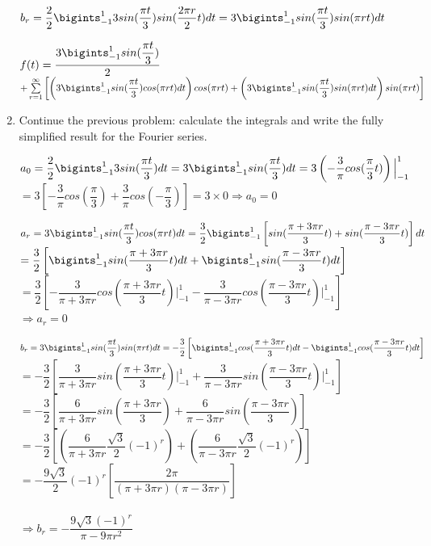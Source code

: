 \documentclass[fleqn]{article}
\begin{document}
\begin{enumerate}
    \textcolor{hwColor}{
      $b_r=\dfrac{2}{2}\bigints_{-1}^{1}3sin(\dfrac{\pi t}{3}) sin(\dfrac{2\pi r}{2}t)dt=3\bigints_{-1}^{1}sin(\dfrac{\pi t}{3}) sin(\pi rt)dt$ \\ 
    }

    \textcolor{hwColor}{
      $f(t)=\dfrac{3 \bigints_{-1}^{1}sin(\dfrac{\pi t}{3})}{2}$ \\
      $+\sum\limits_{r=1}^{\infty}\left[\left(3\bigints_{-1}^{1}sin(\dfrac{\pi t}{3}) cos(\pi rt)dt\right) cos(\pi rt)+\left(3\bigints_{-1}^{1}sin(\dfrac{\pi t}{3}) sin(\pi rt)dt\right) sin(\pi rt)\right]$
    }
    

  \item Continue the previous problem:  calculate the integrals and write the fully simplified result for the Fourier series.

    \textcolor{hwColor}{
      $a_0=\dfrac{2}{2}\bigints_{-1}^{1}3sin(\dfrac{\pi t}{3})dt=3 \bigints_{-1}^{1}sin(\dfrac{\pi t}{3})dt=3\left(-\dfrac{3}{\pi}cos(\dfrac{\pi}{3}t)\right)\Big|_{-1}^{1}$ \\
      $=3\left[-\dfrac{3}{\pi}cos(\dfrac{\pi}{3})+\dfrac{3}{\pi}cos(-\dfrac{\pi}{3})\right]=3 \times 0 \Longrightarrow a_0=0$
    }

    \bigbreak

    \textcolor{hwColor}{
      $a_r=3\bigints_{-1}^{1}sin(\dfrac{\pi t}{3}) cos(\pi rt)dt=\dfrac{3}{2}\bigints_{-1}^{1}\left[sin(\dfrac{\pi +3\pi r}{3}t)+sin(\dfrac{\pi - 3\pi r}{3}t)\right]dt$ \\
      $=\dfrac{3}{2}\left[\bigints_{-1}^{1}sin(\dfrac{\pi +3\pi r}{3}t) dt+\bigints_{-1}^{1}sin(\dfrac{\pi - 3\pi r}{3}t) dt\right]$ \\
      $=\dfrac{3}{2} \left[-\dfrac{3}{\pi + 3\pi r}cos(\dfrac{\pi + 3\pi r}{3}t)\Big|_{-1}^{1}-\dfrac{3}{\pi -3\pi r}cos(\dfrac{\pi -3\pi r}{3}t)\Big|_{-1}^{1}\right]$ \\
      $\Longrightarrow a_r=0$
    }

    \bigbreak
  
    \textcolor{hwColor}{
      $b_r=3\bigints_{-1}^{1}sin(\dfrac{\pi t}{3}) sin(\pi rt)dt=-\dfrac{3}{2}\left[\bigints_{-1}^{1} cos(\dfrac{\pi + 3\pi r}{3}t)dt-\bigints_{-1}^{1}cos(\dfrac{\pi - 3\pi r}{3}t)dt\right]$ \\
      $=-\dfrac{3}{2}\left[\dfrac{3}{\pi + 3\pi r}sin(\dfrac{\pi + 3\pi r}{3}t)\Big|_{-1}^{1}+\dfrac{3}{\pi - 3\pi r}sin(\dfrac{\pi - 3\pi r}{3}t)\Big|_{-1}^{1}\right]$ \\
      $=-\dfrac{3}{2} \left[\dfrac{6}{\pi + 3\pi r}sin(\dfrac{\pi + 3\pi r}{3})+\dfrac{6}{\pi - 3\pi r}sin(\dfrac{\pi - 3\pi r}{3})\right]$ \\
      $=-\dfrac{3}{2}\left[\left(\dfrac{6}{\pi + 3\pi r}\dfrac{\sqrt{3}}{2}(-1)^r\right)+\left(\dfrac{6}{\pi - 3\pi r}\dfrac{\sqrt{3}}{2}(-1)^r\right)\right]$ \\
      $=-\dfrac{9\sqrt{3}}{2}(-1)^r\left[\dfrac{2\pi}{(\pi +3\pi r)(\pi - 3\pi r)}\right]$ \\
      \\
      $\Longrightarrow b_r=-\dfrac{9\sqrt{3}(-1)^r}{\pi - 9\pi r^2}$
    }


\end{enumerate}
\end{document}
